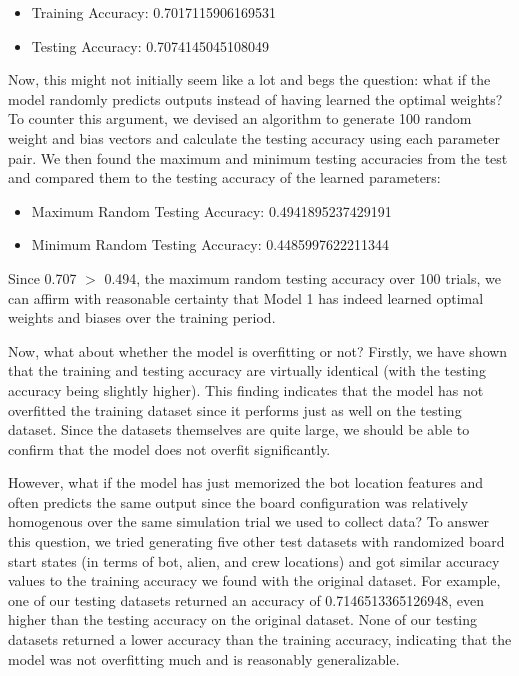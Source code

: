 \documentclass[11pt]{article}
\begin{document}
\begin{itemize}
    \item Training Accuracy: 0.7017115906169531
    \item Testing Accuracy: 0.7074145045108049
\end{itemize}

Now, this might not initially seem like a lot and begs the question: what if the model randomly predicts outputs instead of having learned the optimal weights? To counter this argument, we devised an algorithm to generate 100 random weight and bias vectors and calculate the testing accuracy using each parameter pair. We then found the maximum and minimum testing accuracies from the test and compared them to the testing accuracy of the learned parameters:

\begin{itemize}
    \item Maximum Random Testing Accuracy: 0.4941895237429191
    \item Minimum Random Testing Accuracy: 0.4485997622211344
\end{itemize}

Since 0.707 $>$ 0.494, the maximum random testing accuracy over 100 trials, we can affirm with reasonable certainty that Model 1 has indeed learned optimal weights and biases over the training period.

Now, what about whether the model is overfitting or not? Firstly, we have shown that the training and testing accuracy are virtually identical (with the testing accuracy being slightly higher). This finding indicates that the model has not overfitted the training dataset since it performs just as well on the testing dataset. Since the datasets themselves are quite large, we should be able to confirm that the model does not overfit significantly.

However, what if the model has just memorized the bot location features and often predicts the same output since the board configuration was relatively homogenous over the same simulation trial we used to collect data? To answer this question, we tried generating five other test datasets with randomized board start states (in terms of bot, alien, and crew locations) and got similar accuracy values to the training accuracy we found with the original dataset. For example, one of our testing datasets returned an accuracy of 0.7146513365126948, even higher than the testing accuracy on the original dataset. None of our testing datasets returned a lower accuracy than the training accuracy, indicating that the model was not overfitting much and is reasonably generalizable.
\end{document}
